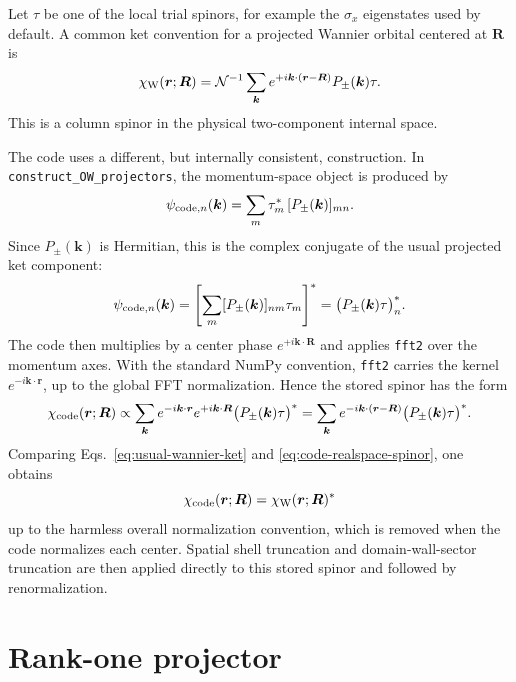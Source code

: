 \documentclass[aps,prb,onecolumn,nofootinbib,superscriptaddress]{revtex4-2}
\newcommand{\kk}{\bm{k}}
\newcommand{\rr}{\bm{r}}
\newcommand{\RR}{\bm{R}}
\newcommand{\chiC}{\chi_{\rm code}}
\newcommand{\chiW}{\chi_{\rm W}}
\begin{document}
Let $\tau$ be one of the local trial spinors, for example the $\sigma_x$
eigenstates used by default.  A common ket convention for a projected Wannier
orbital centered at $\RR$ is
\begin{equation}
    \chiW(\rr;\RR)
    =
    \mathcal{N}^{-1}
    \sum_{\kk}
    e^{+i\kk\cdot(\rr-\RR)}
    P_\pm(\kk)\tau .
    \label{eq:usual-wannier-ket}
\end{equation}
This is a column spinor in the physical two-component internal space.

The code uses a different, but internally consistent, construction.  In
\texttt{construct\_OW\_projectors}, the momentum-space object is produced by
\begin{equation}
    \psi_{{\rm code},n}(\kk)
    =
    \sum_m \tau_m^*\, [P_\pm(\kk)]_{mn}.
    \label{eq:code-momentum-row}
\end{equation}
Since $P_\pm(\kk)$ is Hermitian, this is the complex conjugate of the usual
projected ket component:
\begin{equation}
    \psi_{{\rm code},n}(\kk)
    =
    \left[
    \sum_m [P_\pm(\kk)]_{nm}\tau_m
    \right]^*
    =
    \bigl(P_\pm(\kk)\tau\bigr)_n^* .
    \label{eq:code-momentum-conjugate}
\end{equation}
The code then multiplies by a center phase $e^{+i\kk\cdot\RR}$ and applies
\texttt{fft2} over the momentum axes.  With the standard NumPy convention,
\texttt{fft2} carries the kernel $e^{-i\kk\cdot\rr}$, up to the global FFT
normalization.  Hence the stored spinor has the form
\begin{equation}
    \chiC(\rr;\RR)
    \propto
    \sum_{\kk}
    e^{-i\kk\cdot\rr}
    e^{+i\kk\cdot\RR}
    \bigl(P_\pm(\kk)\tau\bigr)^*
    =
    \sum_{\kk}
    e^{-i\kk\cdot(\rr-\RR)}
    \bigl(P_\pm(\kk)\tau\bigr)^* .
    \label{eq:code-realspace-spinor}
\end{equation}
Comparing Eqs.~\eqref{eq:usual-wannier-ket} and
\eqref{eq:code-realspace-spinor}, one obtains
\begin{equation}
    \chiC(\rr;\RR)=\chiW(\rr;\RR)^*
    \label{eq:stored-is-conjugate}
\end{equation}
up to the harmless overall normalization convention, which is removed when the
code normalizes each center.  Spatial shell truncation and domain-wall-sector
truncation are then applied directly to this stored spinor and followed by
renormalization.

\section{\texorpdfstring{Rank-one projector}{Rank-one projector}}
\end{document}
